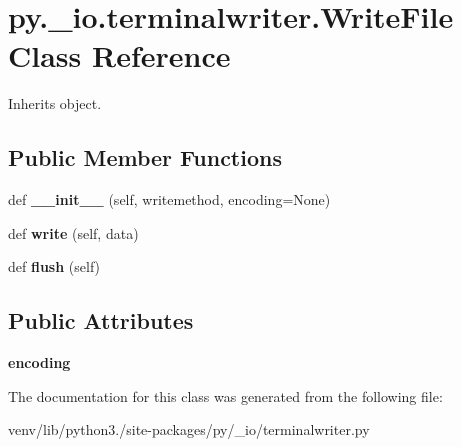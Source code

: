 \hypertarget{classpy_1_1__io_1_1terminalwriter_1_1_write_file}{}\section{py.\+\_\+io.\+terminalwriter.\+Write\+File Class Reference}
\label{classpy_1_1__io_1_1terminalwriter_1_1_write_file}


Inherits object.

\subsection*{Public Member Functions}
\begin{DoxyCompactItemize}
\item 
\mbox{\label{classpy_1_1__io_1_1terminalwriter_1_1_write_file_ab1fecf286bec82cf4725569fd1707db2}} 
def {\bfseries \+\_\+\+\_\+init\+\_\+\+\_\+} (self, writemethod, encoding=None)
\item 
\mbox{\label{classpy_1_1__io_1_1terminalwriter_1_1_write_file_ac491ce28c2a4be3d2dc676adbe336e5c}} 
def {\bfseries write} (self, data)
\item 
\mbox{\label{classpy_1_1__io_1_1terminalwriter_1_1_write_file_a37de88d5510d266ff2e395cab8eb88bd}} 
def {\bfseries flush} (self)
\end{DoxyCompactItemize}
\subsection*{Public Attributes}
\begin{DoxyCompactItemize}
\item 
\mbox{\label{classpy_1_1__io_1_1terminalwriter_1_1_write_file_ac804dd681b2d8c79d49c8961a7327dd1}} 
{\bfseries encoding}
\end{DoxyCompactItemize}


The documentation for this class was generated from the following file\+:\begin{DoxyCompactItemize}
\item 
venv/lib/python3./site-\/packages/py/\+\_\+io/terminalwriter.\+py\end{DoxyCompactItemize}
